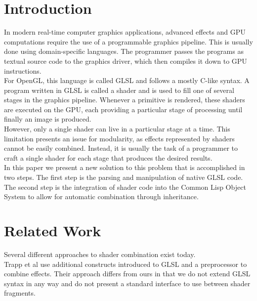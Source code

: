 \documentclass{sig-alternate}
\begin{document}
\printccsdesc

\newpage

\def\abovecaptionskip{1pt}
\def\listingautorefname{listing}
\def\figureautorefname{figure}

\section{Introduction}\label{section:1}
In modern real-time computer graphics applications, advanced effects and GPU computations require the use of a programmable graphics pipeline. This is usually done using domain-specific languages. The programmer passes the programs as textual source code to the graphics driver, which then compiles it down to GPU instructions.\\

For OpenGL, this language is called GLSL\cite{rost2009opengl} and follows a mostly C-like syntax. A program written in GLSL is called a shader and is used to fill one of several stages in the graphics pipeline. Whenever a primitive is rendered, these shaders are executed on the GPU, each providing a particular stage of processing until finally an image is produced. \\

However, only a single shader can live in a particular stage at a time. This limitation presents an issue for modularity, as effects represented by shaders cannot be easily combined. Instead, it is usually the task of a programmer to craft a single shader for each stage that produces the desired results. \\

In this paper we present a new solution to this problem that is accomplished in two steps. The first step is the parsing and manipulation of native GLSL code. The second step is the integration of shader code into the Common Lisp Object System to allow for automatic combination through inheritance.

\section{Related Work}\label{section:2}
Several different approaches to shader combination exist today. \\

Trapp et al\cite{trapp2007automated} use additional constructs introduced to GLSL and a preprocessor to combine effects. Their approach differs from ours in that we do not extend GLSL syntax in any way and do not present a standard interface to use between shader fragments. \\
\end{document}
